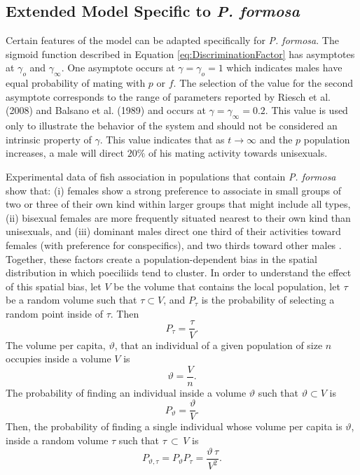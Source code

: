 	\subsection{Extended Model Specific to \textit{P. formosa}}
	Certain features of the model can be adapted specifically for \textit{P. formosa}. The sigmoid function described in Equation \ref{eq:DiscriminationFactor} has asymptotes at $\gamma_o$ and $\gamma_\infty$. One asymptote occurs at $\gamma=\gamma_o = 1$ which indicates males have equal probability of mating with $p$ or $f$.  The selection of the value for the second asymptote corresponds to the range of parameters reported by Riesch et al. (2008) \cite{Riesch:limitation} and Balsano et al. (1989) \cite{Balsano:Poecilia} and occurs at $\gamma = \gamma_\infty = 0.2$. This value is used only to illustrate the behavior of the system and should not be considered an intrinsic property of $\gamma$.  This value indicates that as $t \rightarrow \infty$ and the $p$ population increases, a male will direct $20\%$ of his mating activity towards unisexuals.  
	
	Experimental data of fish association in populations that contain \textit{P. formosa} show that: (i) females show a strong preference to associate in small groups of two or three of their own kind within larger groups that might include all types, (ii) bisexual females are more frequently situated nearest to their own kind than unisexuals, and (iii) dominant males direct one third of their activities toward females (with preference for conspecifics), and two thirds toward other males \cite{Balsano:Poecilia}. Together, these factors create a population-dependent bias in the spatial distribution in which poeciliids tend to cluster. %
	 In order to understand the effect of this spatial bias, let $V$ be the volume that contains the local population, let $\tau$ be a random volume such that $\tau \subset V$, and $P_\tau$ is the probability of selecting a random point inside of $\tau$. Then
	\[
		P_\tau = \frac{\tau}{V}.
	\]
	The volume per capita, $\vartheta$, that an individual of a given population of size $n$ occupies inside a volume $V$ is
	\[
		\vartheta = \frac{V}{n}.
	\]
	The probability of finding an individual inside a volume $\vartheta$ such that $\vartheta \subset V$ is
	\[
		P_\vartheta = \frac{\vartheta}{V}.%
	\]		
	Then, the probability of finding a single individual whose volume per capita is $\vartheta$, inside a random volume $\tau$ such that $\tau \, \subset \, V$ is
	\[
		P_{\vartheta, \tau} = P_\vartheta P_\tau = \frac{\vartheta \, \tau}{V^2}.		
	\]
	
